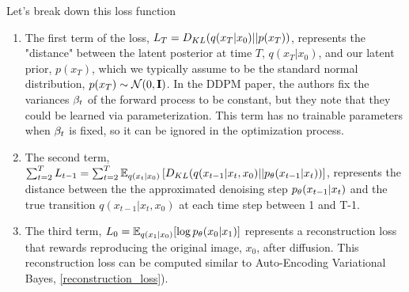 \documentclass{article}
\begin{document}
Let's break down this loss function
\begin{enumerate}
    \item The first term of the loss, $L_T = D_{KL}(q(x_T|x_0) || p(x_T))$, represents the "distance" between the latent posterior at time $T$, $q(x_T|x_0)$, and our latent prior, $p(x_T)$, which we typically assume to be the standard normal distribution, $p(x_T) \sim \mathcal{N}(0,\mathbf{I})$. In the DDPM paper, the authors fix the variances $\beta_{t}$ of the forward process to be constant, but they note that they could be learned via parameterization. This term has no trainable parameters when $\beta_{t}$ is fixed, so it can be ignored in the optimization process. 
    \item The second term, $\sum_{t=2}^T L_{t-1} = \sum_{t=2}^T \mathbb{E}_{q(x_t|x_0)}\left[D_{KL}(q(x_{t-1}|x_t,x_0)||p_\theta(x_{t-1}|x_t))\right]$, represents the distance between the the approximated denoising step $p_\theta(x_{t-1}|x_t)$ and the true transition $q(x_{t-1}|x_t,x_0)$ at each time step between 1 and T-1.
    \item The third term, $L_0 = \mathbb{E}_{q(x_1|x_0)}[\log p_\theta(x_0|x_1)]$ represents a reconstruction loss that rewards reproducing the original image, $x_0$, after diffusion. This reconstruction loss can be computed similar to Auto-Encoding Variational Bayes, \ref{reconstruction_loss}).
\end{enumerate}
\end{document}
